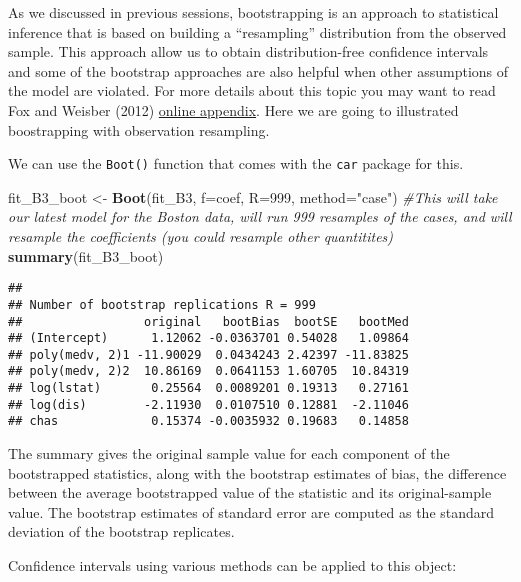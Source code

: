 \documentclass[
]{book}
\newenvironment{Shaded}{\begin{snugshade}}{\end{snugshade}}
\newcommand{\AttributeTok}[1]{\textcolor[rgb]{0.13,0.29,0.53}{#1}}
\newcommand{\CommentTok}[1]{\textcolor[rgb]{0.56,0.35,0.01}{\textit{#1}}}
\newcommand{\DecValTok}[1]{\textcolor[rgb]{0.00,0.00,0.81}{#1}}
\newcommand{\FunctionTok}[1]{\textcolor[rgb]{0.13,0.29,0.53}{\textbf{#1}}}
\newcommand{\NormalTok}[1]{#1}
\newcommand{\OtherTok}[1]{\textcolor[rgb]{0.56,0.35,0.01}{#1}}
\newcommand{\StringTok}[1]{\textcolor[rgb]{0.31,0.60,0.02}{#1}}
\begin{document}
As we discussed in previous sessions, bootstrapping is an approach to statistical inference that is based on building a ``resampling'' distribution from the observed sample. This approach allow us to obtain distribution-free confidence intervals and some of the bootstrap approaches are also helpful when other assumptions of the model are violated. For more details about this topic you may want to read Fox and Weisber (2012) \href{http://socserv.mcmaster.ca/jfox/Books/Companion/appendix/Appendix-Bootstrapping.pdf}{online appendix}. Here we are going to illustrated boostrapping with observation resampling.

We can use the \texttt{Boot()} function that comes with the \texttt{car} package for this.

\begin{Shaded}
\begin{Highlighting}[]
\NormalTok{fit\_B3\_boot }\OtherTok{\textless{}{-}} \FunctionTok{Boot}\NormalTok{(fit\_B3, }\AttributeTok{f=}\NormalTok{coef, }\AttributeTok{R=}\DecValTok{999}\NormalTok{, }\AttributeTok{method=}\StringTok{"case"}\NormalTok{) }\CommentTok{\#This will take our latest model for the Boston data, will run 999 resamples of the cases, and will resample the coefficients (you could resample other quantitites)}
\FunctionTok{summary}\NormalTok{(fit\_B3\_boot)}
\end{Highlighting}
\end{Shaded}

\begin{verbatim}
## 
## Number of bootstrap replications R = 999 
##                 original   bootBias  bootSE   bootMed
## (Intercept)      1.12062 -0.0363701 0.54028   1.09864
## poly(medv, 2)1 -11.90029  0.0434243 2.42397 -11.83825
## poly(medv, 2)2  10.86169  0.0641153 1.60705  10.84319
## log(lstat)       0.25564  0.0089201 0.19313   0.27161
## log(dis)        -2.11930  0.0107510 0.12881  -2.11046
## chas             0.15374 -0.0035932 0.19683   0.14858
\end{verbatim}

The summary gives the original sample value for each component of the bootstrapped statistics, along with the bootstrap estimates of bias, the difference between the average bootstrapped
value of the statistic and its original-sample value. The bootstrap estimates of standard error are computed as the standard deviation of the bootstrap replicates.

Confidence intervals using various methods can be applied to this object:
\end{document}
